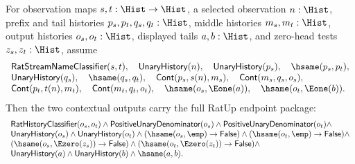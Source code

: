 \begin{theorem}
\label{thm:rat-streamname-unary-context-full-endpoint-package}
For observation maps $s,t:\Hist\to\Hist$, a selected observation $n:\Hist$,
prefix and tail histories $p_s,p_t,q_s,q_t:\Hist$, middle histories
$m_s,m_t:\Hist$, output histories $o_s,o_t:\Hist$, displayed tails
$a,b:\Hist$, and zero-head tests $z_s,z_t:\Hist$, assume
$$
\begin{array}{l}
\mathsf{RatStreamNameClassifier}(s,t),\quad
\mathsf{UnaryHistory}(n),\quad
\mathsf{UnaryHistory}(p_s),\quad
\hsame(p_s,p_t),\\
\mathsf{UnaryHistory}(q_s),\quad
\hsame(q_s,q_t),\quad
\mathsf{Cont}(p_s,s(n),m_s),\quad
\mathsf{Cont}(m_s,q_s,o_s),\\
\mathsf{Cont}(p_t,t(n),m_t),\quad
\mathsf{Cont}(m_t,q_t,o_t),\quad
\hsame(o_s,\Eone(a)),\quad
\hsame(o_t,\Eone(b)).
\end{array}
$$
Then the two contextual outputs carry the full RatUp endpoint package:
$$
\begin{array}{l}
\mathsf{RatHistoryClassifier}(o_s,o_t)\land
\mathsf{PositiveUnaryDenominator}(o_s)\land
\mathsf{PositiveUnaryDenominator}(o_t)\land\\
\mathsf{UnaryHistory}(o_s)\land
\mathsf{UnaryHistory}(o_t)\land
(\hsame(o_s,\emp)\to\mathsf{False})\land
(\hsame(o_t,\emp)\to\mathsf{False})\land\\
(\hsame(o_s,\Ezero(z_s))\to\mathsf{False})\land
(\hsame(o_t,\Ezero(z_t))\to\mathsf{False})\land\\
\mathsf{UnaryHistory}(a)\land
\mathsf{UnaryHistory}(b)\land
\hsame(a,b).
\end{array}
$$
\end{theorem}
